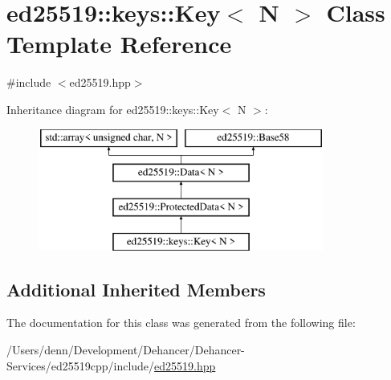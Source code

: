 \hypertarget{classed25519_1_1keys_1_1_key}{}\section{ed25519\+:\+:keys\+:\+:Key$<$ N $>$ Class Template Reference}
\label{classed25519_1_1keys_1_1_key}


{\ttfamily \#include $<$ed25519.\+hpp$>$}

Inheritance diagram for ed25519\+:\+:keys\+:\+:Key$<$ N $>$\+:\begin{figure}[H]
\begin{center}
\leavevmode
\includegraphics[height=4.000000cm]{classed25519_1_1keys_1_1_key}
\end{center}
\end{figure}
\subsection*{Additional Inherited Members}


The documentation for this class was generated from the following file\+:\begin{DoxyCompactItemize}
\item 
/\+Users/denn/\+Development/\+Dehancer/\+Dehancer-\/\+Services/ed25519cpp/include/\mbox{\hyperlink{ed25519_8hpp}{ed25519.\+hpp}}\end{DoxyCompactItemize}
